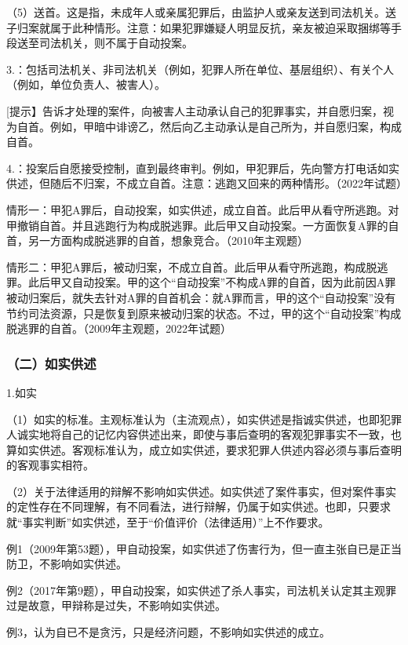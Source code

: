 （5）送首。这是指，未成年人或亲属犯罪后，由监护人或亲友送到司法机关。送子归案就属于此种情形。注意：如果犯罪嫌疑人明显反抗，亲友被迫采取捆绑等手段送至司法机关，则不属于自动投案。

3.：包括司法机关、非司法机关（例如，犯罪人所在单位、基层组织）、有关个人（例如，单位负责人、被害人）。

[提示】告诉才处理的案件，向被害人主动承认自己的犯罪事实，并自愿归案，视为自首。例如，甲暗中诽谤乙，然后向乙主动承认是自己所为，并自愿归案，构成自首。

4.：投案后自愿接受控制，直到最终审判。例如，甲犯罪后，先向警方打电话如实供述，但随后不归案，不成立自首。注意：逃跑又回来的两种情形。（2022年试题）

情形一：甲犯A罪后，自动投案，如实供述，成立自首。此后甲从看守所逃跑。对甲撤销自首。并且逃跑行为构成脱逃罪。此后甲又自动投案。一方面恢复A罪的自首，另一方面构成脱逃罪的自首，想象竞合。（2010年主观题）

情形二：甲犯A罪后，被动归案，不成立自首。此后甲从看守所逃跑，构成脱逃罪。此后甲又自动投案。甲的这个“自动投案”不构成A罪的自首，因为此前因A罪被动归案后，就失去针对A罪的自首机会：就A罪而言，甲的这个“自动投案”没有节约司法资源，只是恢复到原来被动归案的状态。不过，甲的这个“自动投案”构成脱逃罪的自首。（2009年主观题，2022年试题）

\subsubsection*{（二）如实供述}

1.如实

（1）如实的标准。主观标准认为（主流观点），如实供述是指诚实供述，也即犯罪人诚实地将自己的记忆内容供述出来，即使与事后查明的客观犯罪事实不一致，也算如实供述。客观标准认为，成立如实供述，要求犯罪人供述内容必须与事后查明的客观事实相符。

（2）关于法律适用的辩解不影响如实供述。如实供述了案件事实，但对案件事实的定性存在不同理解，有不同看法，进行辩解，仍属于如实供述。也即，只要求就“事实判断”如实供述，至于“价值评价（法律适用）”上不作要求。

例1（2009年第53题），甲自动投案，如实供述了伤害行为，但一直主张自已是正当防卫，不影响如实供述。

例2（2017年第9题），甲自动投案，如实供述了杀人事实，司法机关认定其主观罪过是故意，甲辩称是过失，不影响如实供述。

例3，认为自已不是贪污，只是经济问题，不影响如实供述的成立。

